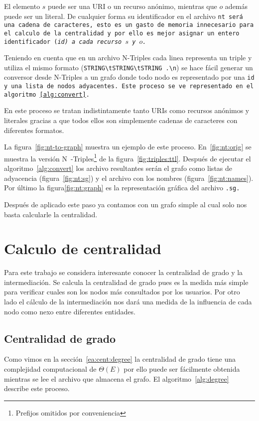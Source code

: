 El elemento $s$ puede ser una URI o un recurso anónimo, mientras que $o$ además
puede ser un literal. De cualquier forma su identificador en el archivo \tt{nt}
será una cadena de caracteres, esto es un gasto de memoria innecesario para el
calculo de la centralidad y por ello es mejor asignar un entero identificador 
(\it{id}) a cada recurso $s$ y $o$.

Teniendo en cuenta que en un archivo N-Triples cada linea representa un triple y
utiliza el mismo formato (\verb$STRING\tSTRING\tSTRING .\n$) se hace fácil
generar un conversor desde N-Triples a un grafo donde todo nodo es representado
por una \tt{id} y una lista de nodos adyacentes. Este proceso se ve representado
en el algoritmo~\ref{alg:convert}.



En este proceso se tratan indistintamente tanto URIs como recursos anónimos y
literales gracias a que todos ellos son simplemente cadenas de caracteres con
diferentes formatos.

La figura~\ref{fig:nt-to-graph} muestra un ejemplo de este proceso.
En~\ref{fig:nt:orig} se muestra la versión N~-Triples\footnote{Prefijos omitidos
por conveniencia} de la figura~\ref{fig:triples:ttl}.
Después de ejecutar el algoritmo~\ref{alg:convert} los archivo resultantes serán
el grafo como listas de adyacencia (figura~\ref{fig:nt:sg}) y el archivo con los
nombres (figura~\ref{fig:nt:names}). Por último la figura\ref{fig:nt:graph} es
la representación gráfica del archivo \tt{.sg}.



Después de aplicado este paso ya contamos con un grafo simple al cual solo nos
basta calcularle la centralidad.

\section{Calculo de centralidad}\label{d:cc}
Para este trabajo se considera interesante conocer la centralidad de grado y la
intermediación. Se calcula la centralidad de grado pues es la medida más simple
para verificar cuales son los nodos más consultados por los usuarios. Por otro
lado el cálculo de la intermediación nos dará una medida de la influencia de
cada nodo como nexo entre diferentes entidades.

\subsection{Centralidad de grado}
Como vimos en la sección~\ref{ea:cent:degree} la centralidad de grado tiene una
complejidad computacional de $\Theta (E)$ por ello puede ser fácilmente obtenida
mientras se lee el archivo que almacena el grafo. El algoritmo~\ref{alg:degree}
describe este proceso.

